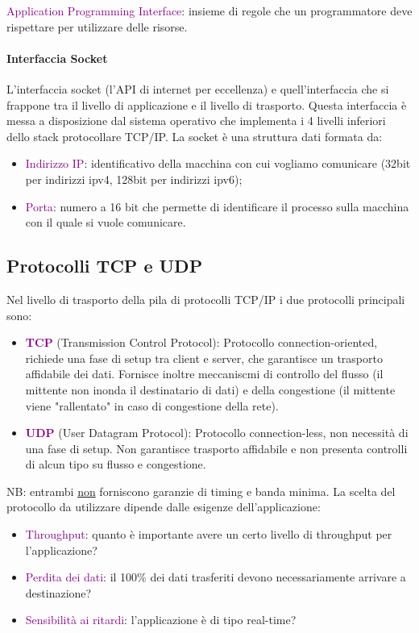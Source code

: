 \begin{definition}[API]
    \textcolor{purple}{Application Programming Interface}: insieme di regole che un programmatore deve rispettare per utilizzare delle risorse.
\end{definition}

\paragraph{Interfaccia Socket} L'interfaccia socket (l'API di internet per eccellenza) e quell'interfaccia che si frappone tra il livello di applicazione e il livello di trasporto. Questa interfaccia è messa a disposizione dal sistema operativo che implementa i 4 livelli inferiori dello stack protocollare TCP/IP.
La socket è una struttura dati formata da:
\begin{itemize}
    \item \textcolor{purple}{Indirizzo IP}: identificativo della macchina con cui vogliamo comunicare (32bit per indirizzi ipv4, 128bit per indirizzi ipv6);
    \item \textcolor{purple}{Porta}: numero a 16 bit che permette di identificare il processo sulla macchina con il quale si vuole comunicare.
\end{itemize} 

\subsection{Protocolli TCP e UDP}
Nel livello di trasporto della pila di protocolli TCP/IP i due protocolli principali sono:
\begin{itemize}
    \item \textbf{\textcolor{purple}{TCP}} (Transmission Control Protocol): Protocollo connection-oriented, richiede una fase di setup tra client e server, che garantisce un trasporto affidabile dei dati. Fornisce inoltre meccaniscmi di controllo del flusso (il mittente non inonda il destinatario di dati) e della congestione (il mittente viene "rallentato" in caso di congestione della rete).
    \item \textbf{\textcolor{purple}{UDP}} (User Datagram Protocol): Protocollo connection-less, non necessità di una fase di setup. Non garantisce trasporto affidabile e non presenta controlli di alcun tipo su flusso e congestione.
\end{itemize}
NB: entrambi \underline{non} forniscono garanzie di timing e banda minima.
\newline
\newline La scelta del protocollo da utilizzare dipende dalle esigenze dell'applicazione:
\begin{itemize}
    \item \textcolor{purple}{Throughput}: quanto è importante avere un certo livello di throughput per l'applicazione?
    \item \textcolor{purple}{Perdita dei dati}: il 100$\%$ dei dati trasferiti devono necessariamente arrivare a destinazione?
    \item \textcolor{purple}{Sensibilità ai ritardi}: l'applicazione è di tipo real-time?
\end{itemize}

